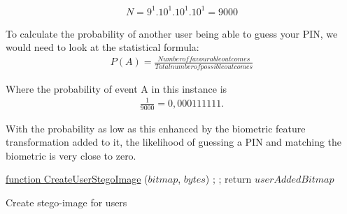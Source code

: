 \begin{gather}
    N = 9^{1}.10^{1}.10^{1}.10^{1} 
    = 9000    
\end{gather}



To calculate the probability of another user being able to guess your PIN, we would need to look at the statistical formula: 
\begin{gather}
    P (A) = \frac{Number of favourable outcomes}{Total number of possible outcomes}
\end{gather}


Where the probability of event A in this instance is 
\begin{gather}
    \frac{1}{9000} = 0,000111111.
\end{gather}

With the probability as low as this enhanced by the biometric feature transformation added to it, the likelihood of guessing a PIN and matching the biometric is very close to zero.


\begin{algorithm}
     \underline{function CreateUserStegoImage} ($bitmap$, $bytes$)\;
     ;
     ;
     return $userAddedBitmap$
     
     \label{algorithm: Create stego-image for users}
     \caption{Create stego-image for users}
\end{algorithm}


